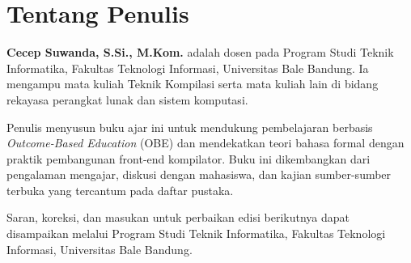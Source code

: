 \chapter*{Tentang Penulis}

\textbf{Cecep Suwanda, S.Si., M.Kom.} adalah dosen pada Program Studi
Teknik Informatika, Fakultas Teknologi Informasi, Universitas Bale
Bandung. Ia mengampu mata kuliah Teknik Kompilasi serta mata kuliah
lain di bidang rekayasa perangkat lunak dan sistem komputasi.

Penulis menyusun buku ajar ini untuk mendukung pembelajaran berbasis
\textit{Outcome-Based Education} (OBE) dan mendekatkan teori bahasa
formal dengan praktik pembangunan front-end kompilator. Buku ini
dikembangkan dari pengalaman mengajar, diskusi dengan mahasiswa, dan
kajian sumber-sumber terbuka yang tercantum pada daftar pustaka.

Saran, koreksi, dan masukan untuk perbaikan edisi berikutnya dapat
disampaikan melalui Program Studi Teknik Informatika, Fakultas
Teknologi Informasi, Universitas Bale Bandung.
